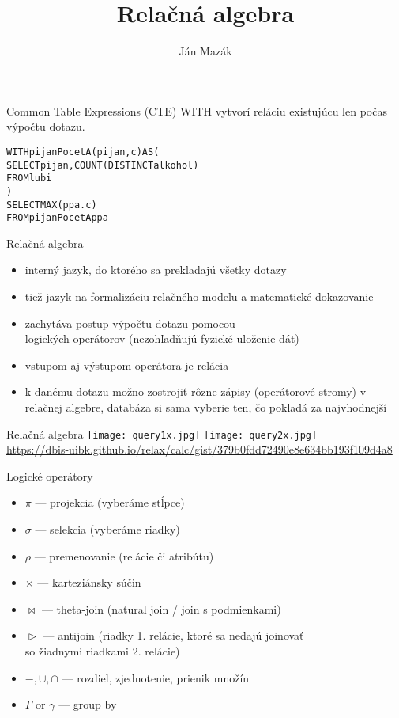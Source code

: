 \documentclass[12pt]{beamer}
\title{Relačná algebra}
\author{Ján Mazák}
\institute{FMFI UK Bratislava}
\date{}
\DeclareMathOperator{\antijoin}{\rhd}
\begin{document}
\frame{\titlepage}

\begin{frame}[fragile]{Common Table Expressions (CTE)}
WITH vytvorí reláciu existujúcu len počas výpočtu dotazu.
\bigskip
\begin{alltt}
\alert{WITH} pijanPocetA(pijan, c) AS (
    SELECT pijan, COUNT(DISTINCT alkohol)
    FROM lubi
)
SELECT MAX(ppa.c)
FROM pijanPocetA ppa
\end{alltt}
\end{frame}

\begin{frame}[fragile]{Relačná algebra}
\begin{itemize}
    \item interný jazyk, do ktorého sa prekladajú všetky dotazy
    \item tiež jazyk na formalizáciu relačného modelu a matematické dokazovanie
    \item zachytáva postup výpočtu dotazu pomocou\\ \alert{logických operátorov} (nezohľadňujú fyzické uloženie dát)
    \item vstupom aj výstupom operátora je relácia
    \item k danému dotazu možno zostrojiť rôzne zápisy (operátorové stromy) v relačnej algebre, databáza si sama vyberie ten, čo pokladá za najvhodnejší
\end{itemize}
\end{frame}

\begin{frame}[fragile]{Relačná algebra}
\texttt{[image: query1x.jpg]}
\texttt{[image: query2x.jpg]}\\[3mm]
\tiny{\url{https://dbis-uibk.github.io/relax/calc/gist/379b0fdd72490e8e634bb193f109d4a8}}
\end{frame}

\begin{frame}[fragile]{Logické operátory}
\begin{itemize}
    \item $\pi$ --- projekcia (vyberáme stĺpce)
    \item $\sigma$ --- selekcia (vyberáme riadky)
    \item $\rho$ --- premenovanie (relácie či atribútu)
    \item $\times$ --- karteziánsky súčin
    \item $\bowtie$ --- theta-join (natural join / join s podmienkami)
    \item $\antijoin$ --- antijoin (riadky 1. relácie, ktoré sa nedajú joinovať\\ \hskip 2.5cm so žiadnymi riadkami 2. relácie)
    \item $-, \cup, \cap$ --- rozdiel, zjednotenie, prienik množín
    \item $\Gamma$ or $\gamma$ --- group by
\end{itemize}
\end{frame}
\end{document}
